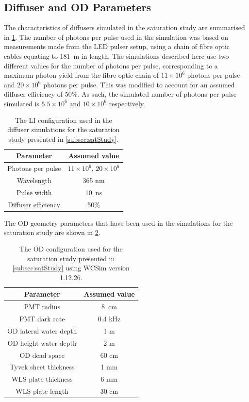 \documentclass[a4paper,11pt]{article}
\begin{document}
\subsection{Diffuser and OD Parameters}\label{subsec:params}

The characteristics of diffusers simulated in the saturation study are summarised in \cref{tab:satStudyParams}. The number of photons per pulse used in the simulation was based on measurements made from the LED pulser setup, using a chain of fibre optic cables equating to 181~m in length. The simulations described here use two different values for the number of photons per pulse, corresponding to a maximum photon yield from the fibre optic chain of $11\times10^6$ photons per pulse and $20\times10^6$ photons per pulse. This was modified to account for an assumed diffuser efficiency of 50\%. As such, the simulated number of photons per pulse simulated is $5.5\times10^6$ and $10\times10^6$ respectively.

\begin{table}[ht!]
    \centering
    \begin{tabular}{|c|c|}
    \hline
        Parameter    & Assumed value \\
        \hline
       Photons per pulse  &  $11\times10^6$, $20\times10^6$\\
       Wavelength  & 365 nm \\
       Pulse width & 10~ns\\
       Diffuser efficiency & 50\%\\
       \hline
    \end{tabular}
    \caption{The LI configuration used in the diffuser simulations for the saturation study presented in \cref{subsec:satStudy}.}
    \label{tab:satStudyParams}
\end{table}

The OD geometry parameters that have been used in the simulations for the saturation study are shown in \cref{tab:od_config}.

\begin{table}[ht!]
    \centering
    \begin{tabular}{|c|c|}
    \hline
        Parameter    & Assumed value \\
        \hline
       PMT radius  &  8~cm\\
       PMT dark rate & 0.4 kHz \\
       OD lateral water depth  & 1 m \\
       OD height water depth & 2 m\\
       OD dead space & 60 cm \\
       Tyvek sheet thickness & 1 mm\\
       WLS plate thickness & 6 mm \\
       WLS plate length & 30 cm \\
       \hline
    \end{tabular}
    \caption{The OD configuration used for the saturation study presented in \cref{subsec:satStudy} using WCSim version 1.12.26.}
    \label{tab:od_config}
\end{table}
\end{document}
